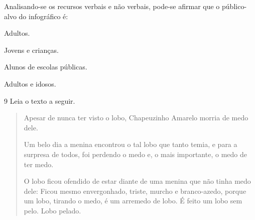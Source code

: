 \noindent Analisando-se os recursos verbais e não verbais, pode-se afirmar que o
público-alvo do infográfico é:

\begin{escolha}
\item Adultos.
\item Jovens e crianças.
\item Alunos de escolas públicas.
\item Adultos e idosos.
\end{escolha}



\num{9} Leia o texto a seguir.

\begin{quote}
\noindent Apesar de nunca ter visto o lobo, Chapeuzinho Amarelo morria de medo
dele.

Um belo dia a menina encontrou o tal lobo que tanto temia, e para a
surpresa de todos, foi perdendo o medo e, o mais importante, o medo de
ter medo.

O lobo ficou ofendido de estar diante de uma menina que não tinha medo
dele: Ficou mesmo envergonhado, triste, murcho e branco-azedo, porque um
lobo, tirando o medo, é um arremedo de lobo. É feito um lobo sem pelo.
Lobo pelado.

\end{quote}

